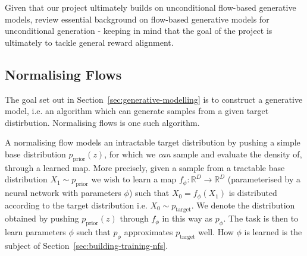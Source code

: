 \documentclass[12pt,a4paper]{report}
\begin{document}
Given that our project ultimately builds on unconditional flow-based generative models, review essential background on flow-based generative models for unconditional generation - keeping in mind that the goal of the project is ultimately to tackle general reward alignment.  


\subsection{Normalising Flows}
The goal set out in Section~\ref{sec:generative-modelling} is to construct a generative model, i.e. an algorithm which can generate samples from a given target distirbution. 
Normalising flows is one such algorithm. 

A normalising flow models an intractable target distribution by pushing a simple base distribution $p_{\text{prior}}(z)$, for which we \emph{can} sample and evaluate the density of, through a learned map. 
More precisely, given a sample from a tractable base distribution $X_1 \sim p_{\text{prior}}$ we wish to learn a map $f_\phi : \mathbb{R}^D \to \mathbb{R}^D$ (parameterised by a neural network with parameters $\phi$) such that $X_0 = f_\phi(X_1)$ is distributed according to the target distribution i.e. $X_0 \sim p_\text{target}$. 
We denote the distribution obtained by pushing $p_{\text{prior}}(z)$ through $f_\phi$ in this way as $p_\phi$. 
The task is then to learn parameters $\phi$ such that $p_\phi$ approximates $p_\text{target}$ well. 
How $\phi$ is learned is the subject of Section~\ref{sec:building-training-nfs}. 
\end{document}
